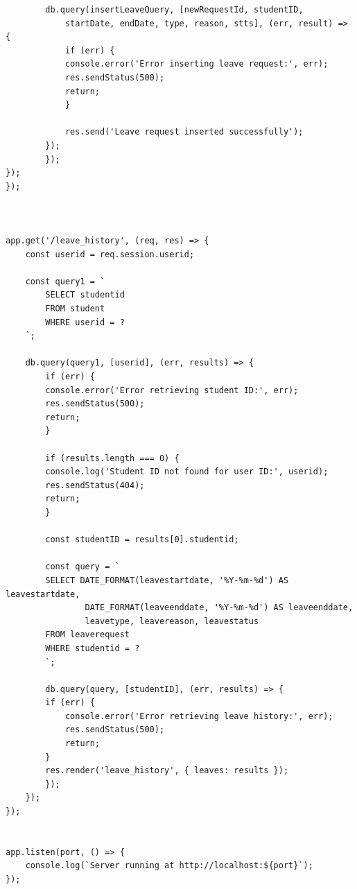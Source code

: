 \documentclass{article}
\begin{document}
\begin{large}
\begin{verbatim}
        db.query(insertLeaveQuery, [newRequestId, studentID, 
            startDate, endDate, type, reason, stts], (err, result) => {
            if (err) {
            console.error('Error inserting leave request:', err);
            res.sendStatus(500);
            return;
            }

            res.send('Leave request inserted successfully');
        });
        });
});
});



app.get('/leave_history', (req, res) => {
    const userid = req.session.userid;

    const query1 = `
        SELECT studentid
        FROM student
        WHERE userid = ?
    `;

    db.query(query1, [userid], (err, results) => {
        if (err) {
        console.error('Error retrieving student ID:', err);
        res.sendStatus(500);
        return;
        }

        if (results.length === 0) {
        console.log('Student ID not found for user ID:', userid);
        res.sendStatus(404);
        return;
        }

        const studentID = results[0].studentid;  

        const query = `
        SELECT DATE_FORMAT(leavestartdate, '%Y-%m-%d') AS leavestartdate,
                DATE_FORMAT(leaveenddate, '%Y-%m-%d') AS leaveenddate,
                leavetype, leavereason, leavestatus
        FROM leaverequest
        WHERE studentid = ?
        `;

        db.query(query, [studentID], (err, results) => {
        if (err) {
            console.error('Error retrieving leave history:', err);
            res.sendStatus(500); 
            return;
        }
        res.render('leave_history', { leaves: results });
        });
    });
});


app.listen(port, () => {
    console.log(`Server running at http://localhost:${port}`);
});

\end{verbatim}
\end{large}
\end{document}
